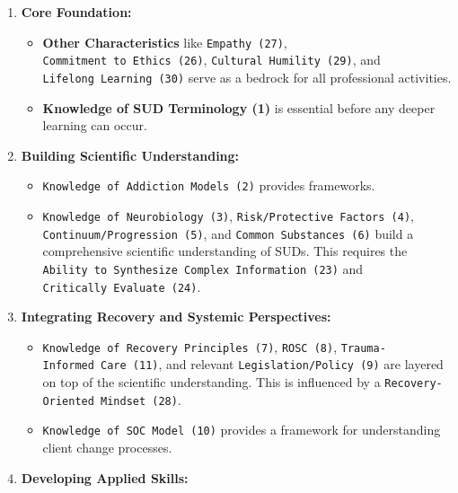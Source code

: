 \documentclass[
  letterpaper,
  DIV=11,
  numbers=noendperiod]{scrartcl}
\providecommand{\tightlist}{%
  \setlength{\itemsep}{0pt}\setlength{\parskip}{0pt}}
\begin{document}
\begin{enumerate}
\def\labelenumi{\arabic{enumi}.}
\tightlist
\item
  \textbf{Core Foundation:}

  \begin{itemize}
  \tightlist
  \item
    \textbf{Other Characteristics} like \texttt{Empathy\ (27)},
    \texttt{Commitment\ to\ Ethics\ (26)},
    \texttt{Cultural\ Humility\ (29)}, and
    \texttt{Lifelong\ Learning\ (30)} serve as a bedrock for all
    professional activities.
  \item
    \textbf{Knowledge of SUD Terminology (1)} is essential before any
    deeper learning can occur.
  \end{itemize}
\item
  \textbf{Building Scientific Understanding:}

  \begin{itemize}
  \tightlist
  \item
    \texttt{Knowledge\ of\ Addiction\ Models\ (2)} provides frameworks.
  \item
    \texttt{Knowledge\ of\ Neurobiology\ (3)},
    \texttt{Risk/Protective\ Factors\ (4)},
    \texttt{Continuum/Progression\ (5)}, and
    \texttt{Common\ Substances\ (6)} build a comprehensive scientific
    understanding of SUDs. This requires the
    \texttt{Ability\ to\ Synthesize\ Complex\ Information\ (23)} and
    \texttt{Critically\ Evaluate\ (24)}.
  \end{itemize}
\item
  \textbf{Integrating Recovery and Systemic Perspectives:}

  \begin{itemize}
  \tightlist
  \item
    \texttt{Knowledge\ of\ Recovery\ Principles\ (7)},
    \texttt{ROSC\ (8)}, \texttt{Trauma-Informed\ Care\ (11)}, and
    relevant \texttt{Legislation/Policy\ (9)} are layered on top of the
    scientific understanding. This is influenced by a
    \texttt{Recovery-Oriented\ Mindset\ (28)}.
  \item
    \texttt{Knowledge\ of\ SOC\ Model\ (10)} provides a framework for
    understanding client change processes.
  \end{itemize}
\item
  \textbf{Developing Applied Skills:}


\end{enumerate}
\end{document}
